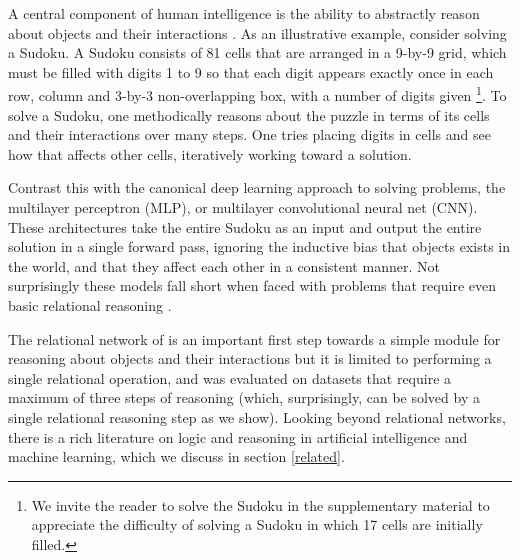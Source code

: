 \documentclass{article}
\newcommand{\rbp}[1]{

}
\begin{document}
A central component of human intelligence is the ability to abstractly reason about objects and their interactions \citep{spelke1995development,spelke2007core}. As an illustrative example,
consider solving a Sudoku. 
A Sudoku consists of 81 cells that are arranged in a 9-by-9 grid, which must be filled with digits 1 to 9 so that
each digit appears exactly once in each row,
column and 3-by-3 non-overlapping box, with a number of digits given \footnote{We invite the reader to solve the Sudoku in the supplementary material to appreciate the difficulty of solving a Sudoku in which 17 cells are initially filled.}.
To solve a Sudoku, one methodically reasons about the puzzle in terms of its cells and their interactions over many steps.
One tries placing digits in cells and see how that affects other cells, iteratively working toward a solution.

Contrast this with the canonical deep learning approach to solving problems, the multilayer perceptron (MLP), or multilayer convolutional neural net (CNN). These architectures take the entire Sudoku as an input and output the entire solution in a single forward pass, ignoring the inductive bias that objects exists in the world, and that they affect each other in a consistent manner. Not surprisingly these models fall short when faced with problems that require even basic relational reasoning \citep{lake2016building,santoro2017simple}. %

The relational network of \citet{santoro2017simple} is an important first step towards a simple module for reasoning about objects and their interactions but it is limited to performing a single relational operation, and was evaluated on datasets that require a maximum of three steps of reasoning (which, surprisingly, can be solved by a single relational reasoning step as we show). 
Looking beyond relational networks, there is a rich literature on logic and reasoning in artificial intelligence and machine learning,
which we discuss in section \ref{related}.
\end{document}

